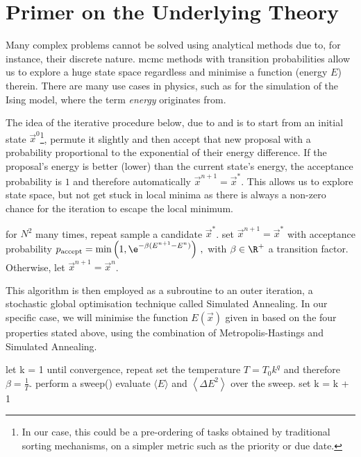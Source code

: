 \section{Primer on the Underlying Theory}
\label{sec:theory}
Many complex problems cannot be solved using analytical methods due to, for instance, their discrete nature.
\gls{mcmc} methods with transition probabilities allow us to explore a huge state space regardless and minimise a function (energy $E$) therein.
There are many use cases in physics, such as for the simulation of the Ising model, where the term \textit{energy} originates from.

The idea of the iterative procedure below, due to \cite{metropolis} and \cite{hastings} is to start from an initial state $\vec{x}^0$\footnote{In our case, this could be a pre-ordering of tasks obtained by traditional sorting mechanisms, on a simpler metric such as the priority or due date.}, permute it slightly and then accept that new proposal with a probability proportional to the exponential of their energy difference.
If the proposal's energy is better (lower) than the current state's energy, the acceptance probability is $1$ and therefore automatically $\vec{x}^{n+1} = \vec{x}^*$.
This allows us to explore state space, but not get stuck in local minima as there is always a non-zero chance for the iteration to escape the local minimum.
\vspace{1cm}

\begin{algorithm}[language=pseudo,caption={\centering The Metropolis-Hastings sweep() sub-routine},basicstyle=\footnotesize]
for $N^2$ many times, repeat
  sample a candidate $\vec{x}^*$.
  set $\vec{x}^{n+1} = \vec{x}^*$ with acceptance probability
    $p_{\rm accept} = \min\left(1, \e^{-\beta (E^{n+1} - E^n)}\right)\,,$ with $\beta \in \R^+$ a transition factor.
  Otherwise, let $\vec{x}^{n+1} = \vec{x}^{n}$.
\end{algorithm}

This algorithm is then employed as a subroutine to an outer iteration, a stochastic global optimisation technique called Simulated Annealing.
In our specific case, we will minimise the function $E(\vec{x})$ given in  based on the four properties stated above, using the combination of Metropolis-Hastings and Simulated Annealing.

\begin{algorithm}[language=pseudo,caption={\centering Simulated Annealing},basicstyle=\footnotesize]
let k = 1
until convergence, repeat
  set the temperature $T = T_0 k^{q}$ and therefore $\beta = \frac{1}{T}$.
  perform a sweep()
  evaluate $\langle E\rangle$ and $\left\langle\Delta E^2\right\rangle$ over the sweep.
  set k = k + 1
\end{algorithm}

